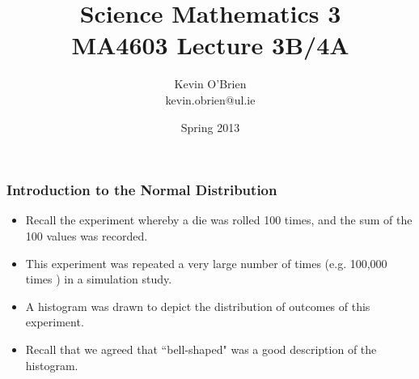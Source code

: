 \documentclass[a4]{beamer}
\title[MA4603]{Science Mathematics 3 \\ {\normalsize MA4603 Lecture 3B/4A}}
\author[Kevin O'Brien]{Kevin O'Brien \\ {\scriptsize kevin.obrien@ul.ie}}
\date{Spring 2013}
\institute[Maths \& Stats]{Dept. of Mathematics \& Statistics, \\ University \textit{of} Limerick}
\begin{document}
	
	\begin{frame}
		\titlepage
	\end{frame}

\begin{frame}

\frametitle{Introduction to the Normal Distribution}
\begin{itemize}
\item
Recall the experiment whereby a die was rolled 100 times, and the sum of the 100 values was recorded.
\item
This experiment was repeated a very large number of times (e.g. 100,000 times ) in a simulation study.
\item
A histogram was drawn to depict the distribution of outcomes of this experiment.
\item Recall that we agreed that ``bell-shaped" was a good description of the histogram.

\end{itemize}
\end{frame}


\end{document}
